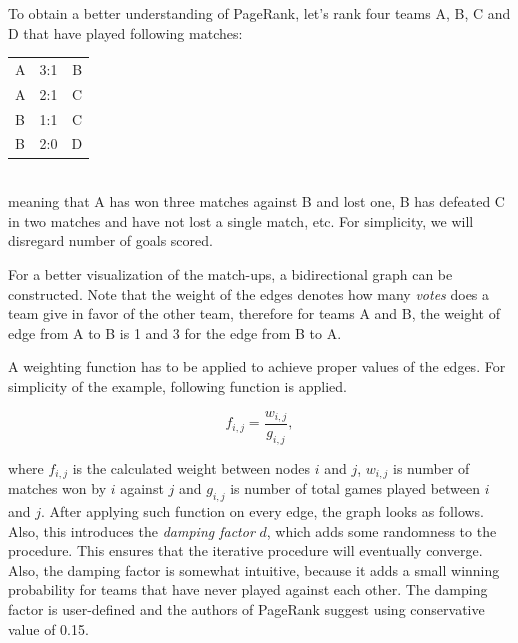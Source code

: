 \examplespace
\begin{example}
To obtain a better understanding of PageRank, let's rank four teams A, B, C and D that have played following matches:\\[0.5em]
\begin{tabular}{l c r} 
A & 3:1 & B \\
A & 2:1 & C \\
B & 1:1 & C \\
B & 2:0 & D \\
\end{tabular}\\[0.5em]
meaning that A has won three matches against B and lost one, B has defeated C in two matches and have not lost a single match, etc.
For simplicity, we will disregard number of goals scored.

For a better visualization of the match-ups, a bidirectional graph can be constructed. Note that the weight of the edges denotes how many \textit{votes} does a team give in favor of the other team, therefore for teams A and B, the weight of edge from A to B is 1 and 3 for the edge from B to A.

\vspace{1em}
\begin{figure}[H]
\centering
{}
\end{figure}

A weighting function has to be applied to achieve proper values of the edges. For simplicity of the example, following function is applied.

\begin{equation*}
f_{i,j} = \frac{w_{i,j}}{g_{i,j}},
\end{equation*}

\noindent where $f_{i,j}$ is the calculated weight between nodes $i$ and $j$, $w_{i,j}$ is number of matches won by $i$ against $j$ and $g_{i,j}$ is number of total games played between $i$ and $j$. After applying such function on every edge, the graph looks as follows. Also, this introduces the \textit{damping factor} $d$, which adds some randomness to the procedure. This ensures that the iterative procedure will eventually converge. Also, the damping factor is somewhat intuitive, because it adds a small winning probability for teams that have never played against each other. The damping factor is user-defined and the authors of PageRank suggest using conservative value of 0.15.


\end{example}
